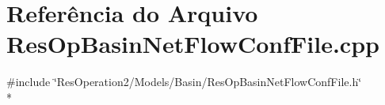 \section{Referência do Arquivo Res\+Op\+Basin\+Net\+Flow\+Conf\+File.\+cpp}
\label{_res_op_basin_net_flow_conf_file_8cpp}
{\ttfamily \#include \char`\"{}Res\+Operation2/\+Models/\+Basin/\+Res\+Op\+Basin\+Net\+Flow\+Conf\+File.\+h\char`\"{}}\\*
